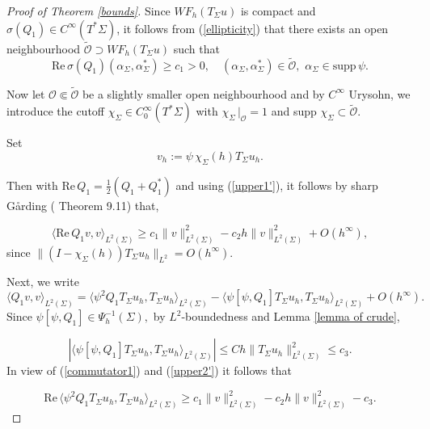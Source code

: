 \documentclass[11pt,reqno]{amsart}
\renewcommand{\Re} {\mathrm{Re\,}}
\theoremstyle{definition}
\begin{document}
\begin{proof}[Proof of Theorem \ref{bounds}]
Since $WF_h(T_\Sigma u)$ is compact  and $\sigma(Q_1) \in C^{\infty}(T^*\Sigma)$, it follows from (\ref{ellipticity}) that there exists an open neighbourhood $\tilde{\mathcal O} \supset WF_h(T_\Sigma u)$ such that
\begin{equation} \label{upper1'}
\Re \sigma(Q_1)(\alpha_\Sigma, \alpha_\Sigma^*) \geq c_1 >0, \quad (\alpha_\Sigma,\alpha_\Sigma^*) \in \tilde{\mathcal O}, \,\, \alpha_\Sigma \in \text{supp} \, \psi.
\end{equation}








Now let $ {\mathcal O} \Subset \tilde{{\mathcal O}} $ be a slightly smaller open neighbourhood and by $C^{\infty}$ Urysohn, we introduce the cutoff  $\chi_\Sigma \in C^{\infty}_0(T^*\Sigma)$ with  $\chi_\Sigma  \,|_{{\mathcal O}} =1$ and supp $\chi_{\Sigma} \subset \tilde{\mathcal O}.$

Set 
$$ v_h := \psi \, \chi_{\Sigma}(h) T_\Sigma u_h.$$

Then with $\Re Q_1 = \frac{1}{2} (Q_1 + Q_1^*)$ and using (\ref{upper1'}), it follows by sharp G\aa rding (\cite{Zw12} Theorem 9.11) that,

\begin{equation} \label{upper2'}
\langle \Re Q_1  v, v \rangle_{L^2(\Sigma)} \geq c_1 \| v \|^2_{L^2(\Sigma)} - c_2 h \| v\|^2_{L^2(\Sigma)} + O(h^{\infty}),
\end{equation}
since $\| (I-\chi_{\Sigma}(h)) T_\Sigma u_h \|_{L^2} = O(h^{\infty}).$ 

Next, we write 
\begin{equation} \label{commutator1}
 \langle Q_1  v, v \rangle_{L^2(\Sigma)} = \langle \psi^2 Q_1  T_\Sigma u_h, T_\Sigma u_h  \rangle_{L^2(\Sigma)} - \langle \psi [\psi, Q_1]  T_\Sigma u_h, T_\Sigma u_h  \rangle_{L^2(\Sigma)}+O(h^\infty). 
\end{equation}
Since $ \psi [\psi, Q_1]  \in \Psi^{-1}_h(\Sigma),$ by $L^2$-boundedness and Lemma \ref{lemma of crude},

$$| \langle \psi [\psi, Q_1]  T_\Sigma u_h, T_\Sigma u_h  \rangle_{L^2(\Sigma)} | \leq C h \| T_{\Sigma} u_h \|_{L^2(\Sigma)}^2 \leq c_3. $$
In view of (\ref{commutator1}) and (\ref{upper2'}) it follows that

\begin{equation} \label{upper3}
\Re\langle \psi^2 Q_1  T_\Sigma u_h,  T_\Sigma u_h \rangle_{L^2(\Sigma)} \geq c_1 \| v \|^2_{L^2(\Sigma)} - c_2 h \| v\|^2_{L^2(\Sigma)} - c_3.
\end{equation}



\end{proof}
\end{document}
